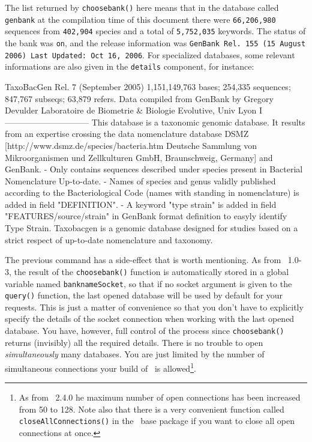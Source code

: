 \documentclass{article}
\begin{document}
The list returned by \texttt{choosebank()} here means that in the database
called \texttt{genbank} at the compilation time
of this document there were 
\texttt{66,206,980}
sequences from
\texttt{402,904}
species and a total of
\texttt{5,752,035}
keywords. The status of the bank was
\texttt{on}, 
and the release information was
\texttt{GenBank Rel. 155 (15 August 2006) Last Updated: Oct 16, 2006}.
For specialized databases, some relevant informations are also given in the
\texttt{details} component, for instance:

\begin{Schunk}
\begin{Soutput}
TaxoBacGen Rel. 7 (September 2005)
1,151,149,763 bases; 254,335 sequences; 847,767 subseqs; 63,879 refers.
Data compiled from GenBank by Gregory Devulder
Laboratoire de Biometrie & Biologie Evolutive, Univ Lyon I
------------------------------
This database is a taxonomic genomic database.
It results from an expertise crossing the data nomenclature database DSMZ
[http://www.dsmz.de/species/bacteria.htm Deutsche Sammlung von
Mikroorganismen und Zellkulturen GmbH, Braunschweig, Germany]
and GenBank.
- Only contains sequences described under species present in
Bacterial Nomenclature Up-to-date.
- Names of species and genus validly published according to the
Bacteriological Code (names with standing in nomenclature) is
added in field "DEFINITION".
- A keyword "type strain" is added in field "FEATURES/source/strain" in
GenBank format definition to easyly identify Type Strain.
Taxobacgen is a genomic database designed for studies based on a strict
respect of up-to-date nomenclature and taxonomy.
\end{Soutput}
\end{Schunk}

The previous command has a side-effect that is worth mentioning. 
As from \seqinr~1.0-3, the result of the \texttt{choosebank()} function is automatically
stored in a global variable named \texttt{banknameSocket}, so that if no socket argument
is given to the \texttt{query()} function, the last opened database will be used by default
for your requests.
This is just a matter of convenience so that you don't have to explicitly specify the details of the
socket connection when working with the last opened database. You have, however,
full control of the process since \texttt{choosebank()} returns (invisibly) all the
required details. There is no trouble to open \emph{simultaneously} many databases.
You are just limited by the number of simultaneous connections your build of \Rlogo{}~is
allowed\footnote{
As from \Rlogo{}~2.4.0 he maximum number of open connections has been increased from
50 to 128. Note also that 
there is a very convenient function called \texttt{closeAllConnections()} in the \Rlogo{}~base package if
you want to close all open connections at once.}.
\end{document}
